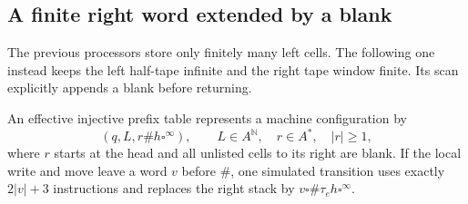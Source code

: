 \subsection{A finite right word extended by a blank}
\label{subsec:sb-rightword}
The previous processors store only finitely many left cells.  The following one instead keeps the left half-tape infinite and the right tape window finite.  Its scan explicitly appends a blank before returning.

\begin{lemma}\label{lem:sb-rightword}
An effective injective prefix table represents a machine configuration by
\[
 (q,L,r\#h\square^\infty),\qquad L\in A^{\mathbb N},\quad r\in A^*,\quad |r|\ge1,
\]
where $r$ starts at the head and all unlisted cells to its right are blank.  If the local write and move leave a word $v$ before $\#$, one simulated transition uses exactly $2|v|+3$ instructions and replaces the right stack by $v\square\#\tau_eh\square^\infty$.
\end{lemma}
